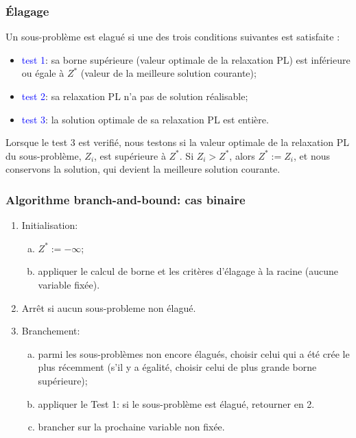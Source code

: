 \documentclass[usepdftitle=false]{beamer}
\begin{document}
\begin{frame}
\frametitle{Élagage}

Un sous-problème est elagué si une des trois conditions suivantes est satisfaite :
\begin{itemize}
\item
\textcolor{blue}{test 1}: sa borne supérieure (valeur optimale de la relaxation PL) est inférieure ou égale à $Z^*$ (valeur de la meilleure solution courante);
\item
\textcolor{blue}{test 2}: sa relaxation PL n'a pas de solution réalisable;
\item
\textcolor{blue}{test 3}: la solution optimale de sa relaxation PL est entière.
\end{itemize}
Lorsque le test 3 est verifié, nous testons si la valeur optimale de la relaxation PL du sous-problème, $Z_i$, est supérieure à $Z^*$.
Si $Z_i > Z^*$, alors $Z^* := Z_i$, et nous conservons la solution, qui
devient la meilleure solution courante.

\end{frame}

\begin{frame}
\frametitle{Algorithme branch-and-bound: cas binaire}

\begin{enumerate}
\item
Initialisation:
\begin{enumerate}[(a)]
\item
$Z^* := -\infty$;
\item
appliquer le calcul de borne et les critères d'élagage à la racine (aucune variable fixée).
\end{enumerate}
\item
Arrêt si aucun sous-probleme non élagué.
\item
Branchement:
\begin{enumerate}[(a)]
\item
parmi les sous-problèmes non encore élagués, choisir celui qui a été crée le plus récemment (s'il y a égalité, choisir celui de plus grande borne supérieure);
\item
appliquer le Test 1: si le sous-problème est élagué,
retourner en 2.
\item
brancher sur la prochaine variable non fixée.
\end{enumerate}
\end{enumerate}

\end{frame}
\end{document}
